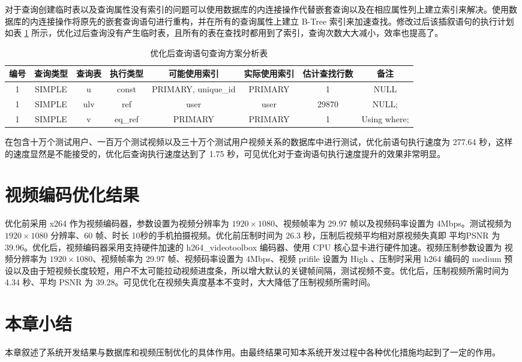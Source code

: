 对于查询创建临时表以及查询属性没有索引的问题可以使用数据库的内连接操作代替嵌套查询以及在相应属性列上建立索引来解决。使用数据库的内连接操作将原先的嵌套查询语句进行重构，并在所有的查询属性上建立 B-Tree 索引来加速查找。修改过后该插叙语句的执行计划如表 \ref{tab:af_explain} 所示，优化过后查询没有产生临时表，且所有的表在查找时都用到了索引，查询次数大大减小，效率也提高了。

\begin{table}[!ht]
    \centering
    \caption{优化后查询语句查询方案分析表}
	\label{tab:af_explain}
	\small
    \begin{tabularx}{\textwidth}{cccccccc}
    \toprule
    编号 & 查询类型 & 查询表 & 执行类型 & 可能使用索引 & 实际使用索引 & 估计查找行数 & 备注  \\ \midrule
    1 & SIMPLE & u & const & PRIMARY, unique\_id & PRIMARY & 1 & NULL \\
    1 & SIMPLE & ulv & ref & user & user & 29870 & NULL; \\ 
    1 & SIMPLE & v & eq\_ref & PRIMARY & PRIMARY & 1 & Using where; \\ \bottomrule
    \end{tabularx}
\end{table}


在包含十万个测试用户、一百万个测试视频以及三十万个测试用户视频关系的数据库中进行测试，优化前语句执行速度为 277.64 秒，这样的速度显然是不能接受的，优化后查询执行速度达到了 1.75 秒，可见优化对于查询语句执行速度提升的效果非常明显。


\section{视频编码优化结果}
优化前采用 x264 作为视频编码器，参数设置为视频分辨率为 $1920\times1080$、视频帧率为 29.97 帧以及视频码率设置为 4Mbps。测试视频为 $1920\times1080$ 分辨率、60 帧、时长 10秒的手机拍摄视频。优化前压制时间为 26.3 秒，压制后视频平均相对原视频失真即 平均PSNR 为 39.96。优化后，视频编码器采用支持硬件加速的 h264\_videotoolbox 编码器、使用 CPU 核心显卡进行硬件加速。视频压制参数设置为 视频分辨率为 $1920\times1080$、视频帧率为 29.97 帧、视频码率设置为 4Mbps、视频 prifile 设置为 High 、压制时采用 h264 编码的 medium 预设以及由于短视频长度较短，用户不太可能拉动视频进度条，所以增大默认的关键帧间隔，测试视频不变。优化后，压制视频所需时间为 4.34 秒、平均 PSNR 为 39.28。可见优化在视频失真度基本不变时，大大降低了压制视频所需时间。

\section{本章小结}
本章叙述了系统开发结果与数据库和视频压制优化的具体作用。由最终结果可知本系统开发过程中各种优化措施均起到了一定的作用。
